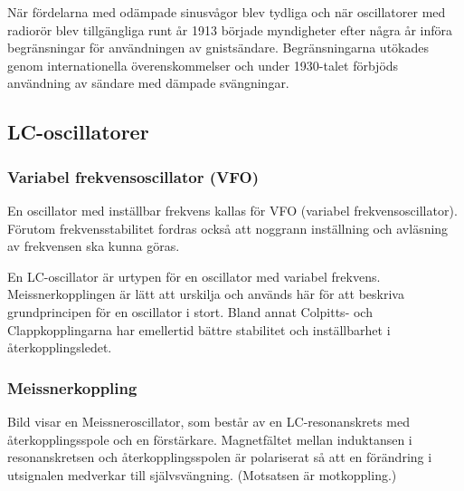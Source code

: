När fördelarna med odämpade sinusvågor blev tydliga och när oscillatorer med
radiorör blev tillgängliga runt år 1913 började myndigheter efter några år
införa begränsningar för användningen av gnistsändare.
Begränsningarna utökades genom internationella överenskommelser och under
1930-talet förbjöds användning av sändare med dämpade svängningar.

\subsection{LC-oscillatorer}
\label{svängningar_LC-oscillator}

\subsubsection{Variabel frekvensoscillator (VFO)}


En oscillator med inställbar frekvens kallas för VFO (variabel
frekvensoscillator).
Förutom frekvensstabilitet fordras också att noggrann inställning och
avläsning av frekvensen ska kunna göras.

En LC-oscillator är urtypen för en oscillator med variabel frekvens.
Meissnerkopplingen är lätt att urskilja och används här för att beskriva
grundprincipen för en oscillator i stort.
Bland annat Colpitts- och Clappkopplingarna har emellertid bättre stabilitet
och inställbarhet i återkopplingsledet.

\subsubsection{Meissnerkoppling}

Bild  visar en Meissneroscillator, som består av en
LC-resonanskrets med återkopplingsspole och en förstärkare.
Magnetfältet mellan induktansen i resonanskretsen och återkopplingsspolen är
polariserat så att en förändring i utsignalen medverkar till självsvängning.
(Motsatsen är motkoppling.)

